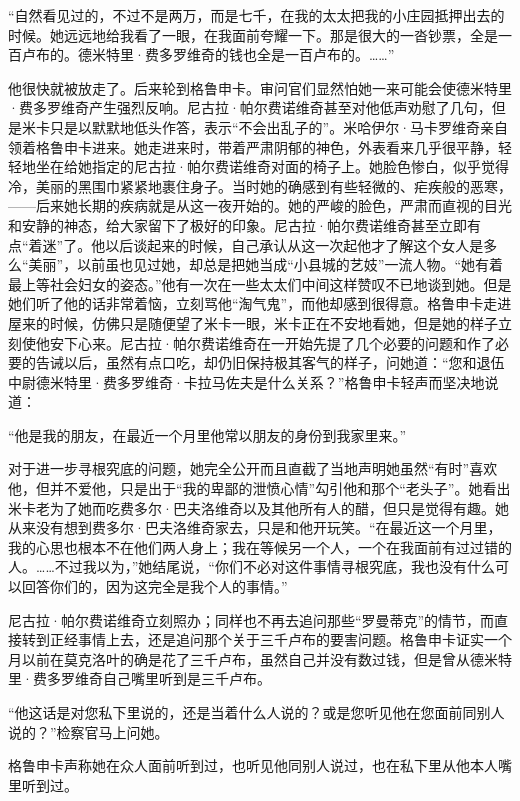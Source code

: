 \par “自然看见过的，不过不是两万，而是七千，在我的太太把我的小庄园抵押出去的时候。她远远地给我看了一眼，在我面前夸耀一下。那是很大的一沓钞票，全是一百卢布的。德米特里·费多罗维奇的钱也全是一百卢布的。……”
\par 他很快就被放走了。后来轮到格鲁申卡。审问官们显然怕她一来可能会使德米特里·费多罗维奇产生强烈反响。尼古拉·帕尔费诺维奇甚至对他低声劝慰了几句，但是米卡只是以默默地低头作答，表示“不会出乱子的”。米哈伊尔·马卡罗维奇亲自领着格鲁申卡进来。她走进来时，带着严肃阴郁的神色，外表看来几乎很平静，轻轻地坐在给她指定的尼古拉·帕尔费诺维奇对面的椅子上。她脸色惨白，似乎觉得冷，美丽的黑围巾紧紧地裹住身子。当时她的确感到有些轻微的、疟疾般的恶寒，——后来她长期的疾病就是从这一夜开始的。她的严峻的脸色，严肃而直视的目光和安静的神态，给大家留下了极好的印象。尼古拉·帕尔费诺维奇甚至立即有点“着迷”了。他以后谈起来的时候，自己承认从这一次起他才了解这个女人是多么“美丽”，以前虽也见过她，却总是把她当成“小县城的艺妓”一流人物。“她有着最上等社会妇女的姿态。”他有一次在一些太太们中间这样赞叹不已地谈到她。但是她们听了他的话非常着恼，立刻骂他“淘气鬼”，而他却感到很得意。格鲁申卡走进屋来的时候，仿佛只是随便望了米卡一眼，米卡正在不安地看她，但是她的样子立刻使他安下心来。尼古拉·帕尔费诺维奇在一开始先提了几个必要的问题和作了必要的告诫以后，虽然有点口吃，却仍旧保持极其客气的样子，问她道：“您和退伍中尉德米特里·费多罗维奇·卡拉马佐夫是什么关系？”格鲁申卡轻声而坚决地说道：
\par “他是我的朋友，在最近一个月里他常以朋友的身份到我家里来。”
\par 对于进一步寻根究底的问题，她完全公开而且直截了当地声明她虽然“有时”喜欢他，但并不爱他，只是出于“我的卑鄙的泄愤心情”勾引他和那个“老头子”。她看出米卡老为了她而吃费多尔·巴夫洛维奇以及其他所有人的醋，但只是觉得有趣。她从来没有想到费多尔·巴夫洛维奇家去，只是和他开玩笑。“在最近这一个月里，我的心思也根本不在他们两人身上；我在等候另一个人，一个在我面前有过过错的人。……不过我以为，”她结尾说，“你们不必对这件事情寻根究底，我也没有什么可以回答你们的，因为这完全是我个人的事情。”
\par 尼古拉·帕尔费诺维奇立刻照办；同样也不再去追问那些“罗曼蒂克”的情节，而直接转到正经事情上去，还是追问那个关于三千卢布的要害问题。格鲁申卡证实一个月以前在莫克洛叶的确是花了三千卢布，虽然自己并没有数过钱，但是曾从德米特里·费多罗维奇自己嘴里听到是三千卢布。
\par “他这话是对您私下里说的，还是当着什么人说的？或是您听见他在您面前同别人说的？”检察官马上问她。
\par 格鲁申卡声称她在众人面前听到过，也听见他同别人说过，也在私下里从他本人嘴里听到过。
